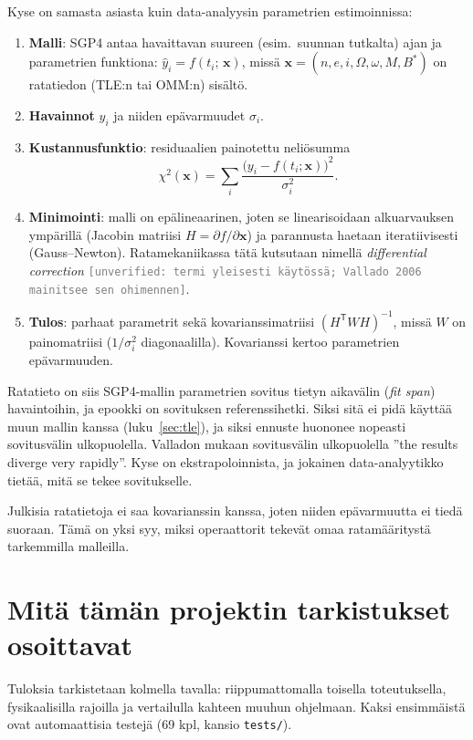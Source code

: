 \documentclass[a4paper,11pt]{article}
\newcommand{\unverified}[1][]{\textcolor{gray}{\texttt{[unverified#1]}}}
\newcommand{\koodi}[1]{\texttt{#1}}
\begin{document}
Kyse on samasta asiasta kuin data-analyysin parametrien estimoinnissa:
\begin{enumerate}
  \item \textbf{Malli}: SGP4 antaa havaittavan suureen (esim.\ suunnan tutkalta) ajan ja parametrien funktiona: $\hat y_i = f(t_i;\,\mathbf x)$, missä $\mathbf x = (n, e, i, \Omega, \omega, M, B^*)$ on ratatiedon (TLE:n tai OMM:n) sisältö.
  \item \textbf{Havainnot} $y_i$ ja niiden epävarmuudet $\sigma_i$.
  \item \textbf{Kustannusfunktio}: residuaalien painotettu neliösumma
  \[
  \chi^2(\mathbf x) = \sum_i \frac{\bigl(y_i - f(t_i;\mathbf x)\bigr)^2}{\sigma_i^2}.
  \]
  \item \textbf{Minimointi}: malli on epälineaarinen, joten se linearisoidaan alkuarvauksen ympärillä (Jacobin matriisi $H = \partial f/\partial \mathbf x$) ja parannusta haetaan iteratiivisesti (Gauss–Newton). Ratamekaniikassa tätä kutsutaan nimellä \emph{differential correction} \unverified[: termi yleisesti käytössä; Vallado 2006 mainitsee sen ohimennen].
  \item \textbf{Tulos}: parhaat parametrit sekä kovarianssimatriisi $(H^{\mathsf T} W H)^{-1}$, missä $W$ on painomatriisi ($1/\sigma_i^2$ diagonaalilla). Kovarianssi kertoo parametrien epävarmuuden.
\end{enumerate}

Ratatieto on siis SGP4-mallin parametrien sovitus tietyn aikavälin (\emph{fit span}) havaintoihin, ja epookki on sovituksen referenssihetki. Siksi sitä ei pidä käyttää muun mallin kanssa (luku~\ref{sec:tle}), ja siksi ennuste huononee nopeasti sovitusvälin ulkopuolella. Valladon mukaan sovitusvälin ulkopuolella ”the results diverge very rapidly”. Kyse on ekstrapoloinnista, ja jokainen data-analyytikko tietää, mitä se tekee sovitukselle.

Julkisia ratatietoja ei saa kovarianssin kanssa, joten niiden epävarmuutta ei tiedä suoraan. Tämä on yksi syy, miksi operaattorit tekevät omaa ratamääritystä tarkemmilla malleilla.

\section{Mitä tämän projektin tarkistukset osoittavat}\label{sec:tarkistukset}

Tuloksia tarkistetaan kolmella tavalla: riippumattomalla toisella toteutuksella,
fysikaalisilla rajoilla ja vertailulla kahteen muuhun ohjelmaan. Kaksi ensimmäistä ovat
automaattisia testejä (69 kpl, kansio \koodi{tests/}).
\end{document}
